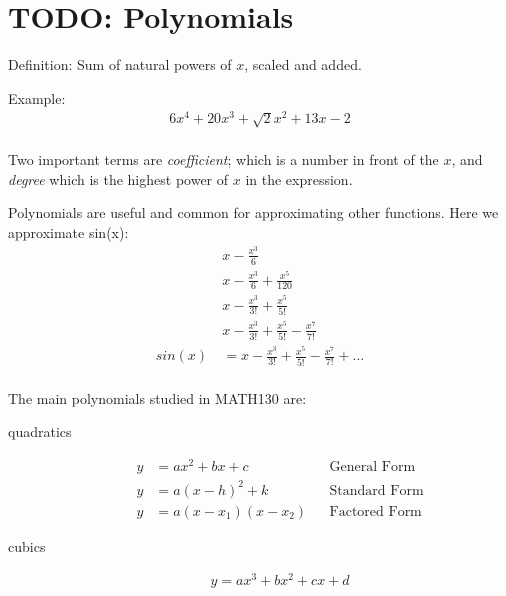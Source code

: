\chapter{TODO: Polynomials}
\label{chap:Polynomials}
Definition: Sum of natural powers of $x$, scaled and added.

Example:
\begin{align}
  6x^4 + 20x^3 + \sqrt{2}x^2 + 13x - 2 \\
\end{align}

Two important terms are \emph{coefficient}; which is a number in front of the
$x$, and \emph{degree} which is the highest power of $x$ in the expression.

Polynomials are useful and common for approximating other functions. Here we
approximate sin(x):
\begin{align}
  &~ x - \frac{x^{3}}{6} \\
  &~ x - \frac{x^{3}}{6} + \frac{x^5}{120} \\
  &~ x - \frac{x^{3}}{3!} + \frac{x^5}{5!} \\
  &~ x - \frac{x^{3}}{3!} + \frac{x^5}{5!} - \frac{x^7}{7!} \\
sin(x) &~ = x - \frac{x^{3}}{3!} + \frac{x^5}{5!} - \frac{x^7}{7!} + \ldots \\
\end{align}

The main polynomials studied in MATH130 are:
\begin{description}
  \item[quadratics]
    \begin{align}
      y & = ax^2 + bx + c       && \text{General Form} \\
      y & = a(x -h)^{2} + k     && \text{Standard Form} \\
      y & = a(x - x_1)(x - x_2) && \text{Factored Form}
    \end{align}
  \item[cubics]
    \begin{align}
      y = ax^3 + bx^2 + cx + d \\
    \end{align}
\end{description}

